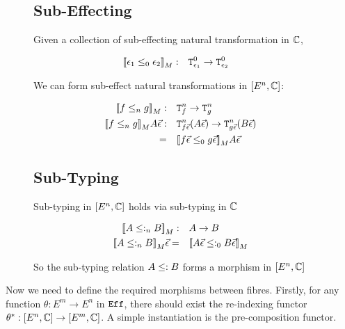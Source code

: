 \documentclass{Report}
\begin{document}
\begin{figure}
    \label{HowToBuildSubeffecting}
    \begin{framed}
        
        \subsection{Sub-Effecting}
        Given a collection of sub-effecting natural transformation in $\mathbb{C}$,
        
        \begin{align}
            {\bf [\![}\epsilon_1\leq_0 \epsilon_2{\bf ]\!]}_M:&\quad \texttt{T}^0_{\epsilon_1} \rightarrow \texttt{T}^0_{\epsilon_2}
        \end{align}
        
        We can form sub-effect natural transformations in $[E^n, \mathbb{C}]$:
        
        \begin{align}
            {\bf [\![}f\leq_n g{\bf ]\!]}_M:&\quad\texttt{T}^n_{f}\rightarrow \texttt{T}^n_{g}\\
            {\bf [\![}f\leq_n g{\bf ]\!]}_M A \vec{\epsilon}:&\quad\texttt{T}^n_{f\vec{\epsilon}}(A\vec{\epsilon})\rightarrow \texttt{T}^n_{g\vec{\epsilon}}(B\vec{\epsilon})\\
            =&\quad {\bf [\![}f\vec{\epsilon}\leq_0 g\vec{\epsilon}{\bf ]\!]}_MA\vec{\epsilon}
        \end{align}
    \end{framed}
\end{figure}

\begin{figure}
    \label{HowToBuildSubtyping}
    \begin{framed}
        
\subsection{Sub-Typing}
Sub-typing in $[E^n, \mathbb{C}]$ holds via sub-typing in $\mathbb{C}$

\begin{align}
    {\bf [\![}A\leq:_n B{\bf ]\!]}_M:&\quad A\rightarrow B\\
    {\bf [\![}A\leq:_n B{\bf ]\!]}_M\vec{\epsilon}=&\quad {\bf [\![}A\vec{\epsilon}\leq:_0 B\vec{\epsilon}{\bf ]\!]}_M
\end{align}

So the sub-typing relation $A \leq: B$ forms a morphism in $[E^n, \mathbb{C}]$

    \end{framed}
\end{figure}

Now we need to define the required morphisms between fibres. Firstly, for any function $\theta: E^m \rightarrow E^n$ in $\texttt{Eff}$, there should exist the re-indexing functor $\theta^*: [E^n, \mathbb{C}] \rightarrow [E^m, \mathbb{C}]$. A simple instantiation is the pre-composition functor.
\end{document}
